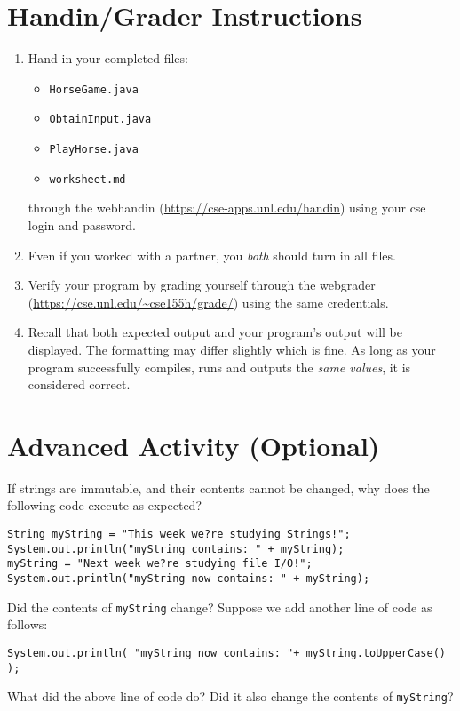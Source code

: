 \documentclass[12pt]{scrartcl}
\begin{document}
\section{Handin/Grader Instructions}

\begin{enumerate}
  \item Hand in your completed files:
    \begin{itemize}
    \item \texttt{HorseGame.java}
    \item \texttt{ObtainInput.java}
    \item \texttt{PlayHorse.java}
    \item \texttt{worksheet.md}
  \end{itemize}
  through the webhandin (\url{https://cse-apps.unl.edu/handin}) 
  using your cse login and password.  
  \item Even if you worked with a partner, you \emph{both} should
  turn in all files.
  \item Verify your program by grading yourself through the
  webgrader (\url{https://cse.unl.edu/~cse155h/grade/}) using the
  same credentials.
  \item Recall that both expected output and your program's output
  will be displayed.  The formatting may differ slightly which is fine.
  As long as your program successfully compiles, runs and outputs 
  the \emph{same values}, it is considered correct.
\end{enumerate}


\section{Advanced Activity (Optional)}

If strings are immutable, and their contents cannot be changed, why does the 
following code execute as expected?  

\begin{verbatim}
String myString = "This week we?re studying Strings!"; 
System.out.println("myString contains: " + myString);
myString = "Next week we?re studying file I/O!";
System.out.println("myString now contains: " + myString);
\end{verbatim}

Did the contents of \texttt{myString} change?
Suppose we add another line of code as follows:

\texttt{System.out.println( "myString now contains: "+ myString.toUpperCase() );}

What did the above line of code do?  Did it also change the contents 
of \texttt{myString}?
\end{document}
